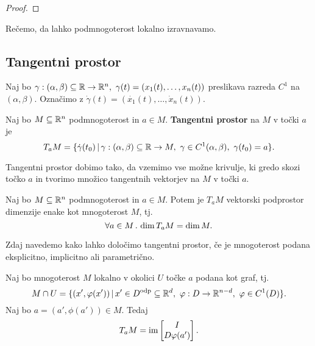 \begin{proof}
    \todo{}
\end{proof}

\begin{opomba}
    Rečemo, da lahko podmnogoterost lokalno izravnavamo.
\end{opomba}

\begin{opomba}
    \todo{}
\end{opomba}

\subsection{Tangentni prostor}
Naj bo \(\gamma: (\alpha, \beta) \subseteq \mathbb{R} \to \mathbb{R}^n,\ \gamma(t) = (x_1(t), \ldots, x_n(t))\) preslikava razreda \(C^1\) na \((\alpha, \beta)\). Označimo  z \(\dot{\gamma}(t) = (\dot{x_1}(t), \ldots, \dot{x}_n(t))\).

\begin{definicija}
    Naj bo \(M \subseteq \mathbb{R}^n\) podmnogoterost in \(a \in M\). \textbf{Tangentni prostor} na \(M\) v točki \(a\) je 
    \[
        T_aM = \setb{\dot{\gamma}(t_0)}{\gamma: (\alpha, \beta) \subseteq \R \to M,\ \gamma \in C^1(\alpha, \beta),\ \gamma(t_0) = a}.
    \]
\end{definicija}

\begin{opomba}
    Tangentni prostor dobimo tako, da vzemimo vse možne krivulje, ki gredo skozi točko \(a\) in tvorimo množico tangentnih vektorjev na \(M\) v točki \(a\).
\end{opomba}

\begin{trditev}
    Naj bo \(M \subseteq \mathbb{R}^n\) podmnogoterost in \(a \in M\). Potem je \(T_aM\) vektorski podprostor dimenzije enake kot mnogoterost \(M\), tj.\ \[\forall a \in M \,.\, \dim T_aM = \dim M.\]
\end{trditev}

Zdaj navedemo kako lahko določimo tangentni prostor, če je mnogoterost podana eksplicitno, implicitno ali parametrično.

\begin{trditev}
    Naj bo mnogoterost \(M\) lokalno v okolici \(U\) točke \(a\) podana kot graf, tj.\
    \[
        M \cap U = \setb{(x', \phi(x'))}{x' \in D^\text{odp} \subseteq \R^d, \ \phi: D \to \R^{n-d},\ \phi \in C^1(D)}.
    \]
    Naj bo \(a = (a', \phi(a')) \in M\). Tedaj 
    \[
        T_aM = \operatorname{im} \begin{bmatrix}
            I \\ D \varphi(a')
        \end{bmatrix}.
    \]
\end{trditev}

